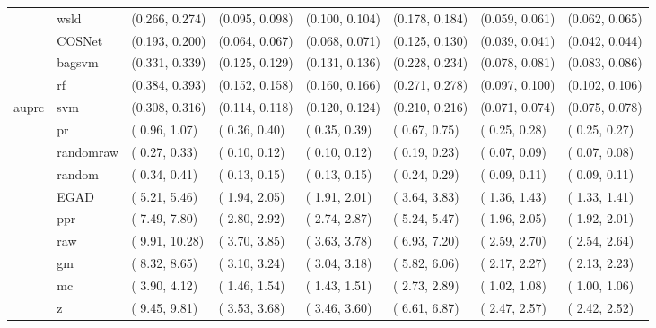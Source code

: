 \begin{table}[H]
{\begin{tabular}{llllllll}
 & wsld & (0.266, 0.274) & (0.095, 0.098) & (0.100, 0.104) & (0.178, 0.184) & (0.059, 0.061) & (0.062, 0.065)\\

 & COSNet & (0.193, 0.200) & (0.064, 0.067) & (0.068, 0.071) & (0.125, 0.130) & (0.039, 0.041) & (0.042, 0.044)\\

 & bagsvm & (0.331, 0.339) & (0.125, 0.129) & (0.131, 0.136) & (0.228, 0.234) & (0.078, 0.081) & (0.083, 0.086)\\

 & rf & (0.384, 0.393) & (0.152, 0.158) & (0.160, 0.166) & (0.271, 0.278) & (0.097, 0.100) & (0.102, 0.106)\\

\multirow{-15}{*}{\raggedright\arraybackslash auprc} & svm & (0.308, 0.316) & (0.114, 0.118) & (0.120, 0.124) & (0.210, 0.216) & (0.071, 0.074) & (0.075, 0.078)\\
\cmidrule{1-8}
 & pr & ( 0.96,  1.07) & ( 0.36,  0.40) & ( 0.35,  0.39) & ( 0.67,  0.75) & ( 0.25,  0.28) & ( 0.25,  0.27)\\

 & randomraw & ( 0.27,  0.33) & ( 0.10,  0.12) & ( 0.10,  0.12) & ( 0.19,  0.23) & ( 0.07,  0.09) & ( 0.07,  0.08)\\

 & random & ( 0.34,  0.41) & ( 0.13,  0.15) & ( 0.13,  0.15) & ( 0.24,  0.29) & ( 0.09,  0.11) & ( 0.09,  0.11)\\

 & EGAD & ( 5.21,  5.46) & ( 1.94,  2.05) & ( 1.91,  2.01) & ( 3.64,  3.83) & ( 1.36,  1.43) & ( 1.33,  1.41)\\

 & ppr & ( 7.49,  7.80) & ( 2.80,  2.92) & ( 2.74,  2.87) & ( 5.24,  5.47) & ( 1.96,  2.05) & ( 1.92,  2.01)\\

 & raw & ( 9.91, 10.28) & ( 3.70,  3.85) & ( 3.63,  3.78) & ( 6.93,  7.20) & ( 2.59,  2.70) & ( 2.54,  2.64)\\

 & gm & ( 8.32,  8.65) & ( 3.10,  3.24) & ( 3.04,  3.18) & ( 5.82,  6.06) & ( 2.17,  2.27) & ( 2.13,  2.23)\\

 & mc & ( 3.90,  4.12) & ( 1.46,  1.54) & ( 1.43,  1.51) & ( 2.73,  2.89) & ( 1.02,  1.08) & ( 1.00,  1.06)\\

 & z & ( 9.45,  9.81) & ( 3.53,  3.68) & ( 3.46,  3.60) & ( 6.61,  6.87) & ( 2.47,  2.57) & ( 2.42,  2.52)\\


\end{tabular}}
\end{table}
